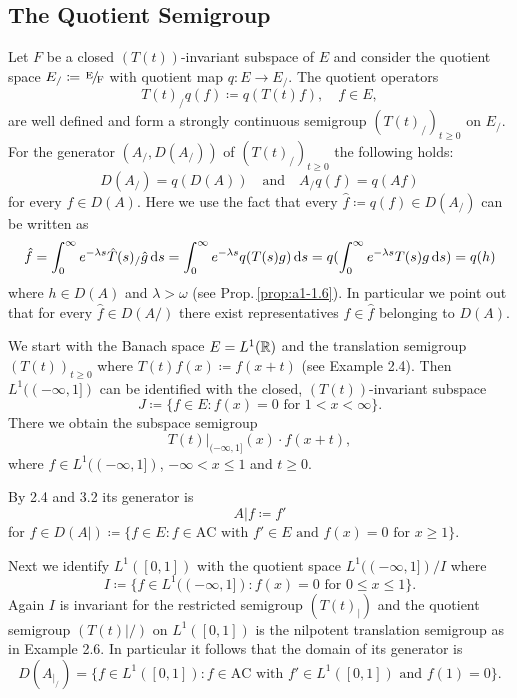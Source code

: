 \subsection{The Quotient Semigroup}\label{subsec:a1-3.3}
Let $F$ be a closed $(T(t))$-invariant subspace of $E$ and consider the quotient space $ E_{/}\coloneqq \nfrac{E}{F} $ with quotient map $q \colon E \to E_{/}$. 
The quotient operators
\[
    T(t)_{/}q(f) \coloneqq q(T(t)f), \quad f \in E,
\]
are well defined and form a strongly continuous semigroup $(T(t)_{/})_{t \geq 0}$ on $E_{/}$.
For the generator $(A_{/},D(A_{/}))$ of $(T(t)_{/})_{t \geq 0}$ the following holds:
\[
    D(A_{/}) = q(D(A)) 
    \quad \text{and} \quad 
    A_{/}q(f) = q(Af)
\]
for every $f \in D(A)$.
Here we use the fact that every $\hat{f} \coloneqq q(f) \in D(A_{/})$ can be written as
\[
    \hat{f} = \int_{0}^{\infty} e^{-\lambda s} \hat{T}(s)_{/}\hat{g} \mathop{}\!\mathrm{d}{s} 
    = \int_{0}^{\infty} e^{-\lambda s}q(T(s)g) \mathop{}\!\mathrm{d}{s} 
    = q(\int_{0}^{\infty} e^{-\lambda s}T(s)g \mathop{}\!\mathrm{d}{s}) = q(h)
\]
where $h \in D(A)$ and $\lambda > \omega$ (see Prop.\,\ref{prop:a1-1.6}).
In particular we point out that for every $\hat{f} \in D(A/)$ there exist representatives $f \in \hat{f}$ belonging to $D(A)$.
\begin{example}\label{ex:a1-3.1}
We start with the Banach space $E = L^{1}(\mathbb{R})$ and the translation semigroup $(T(t))_{t \geq 0}$ where $T(t)f(x) \coloneqq f(x+t)$ (see Example 2.4).
Then $L^{1}((-\infty,1])$ can be identified with the closed, $(T(t))$-invariant subspace
\[
    J \coloneqq \{f \in E \colon f(x) = 0 \text{ for } 1 < x < \infty\} .
\]
There we obtain the subspace semigroup
\[
    T(t)|_{(-\infty,1]}(x) \cdot f(x+t),
\]
where $f \in L^{1}((-\infty,1])$, $-\infty < x \leq 1$ and $t \geq 0$.

By 2.4 and 3.2 its generator is
\[
    A|f \coloneqq f'
\]
for $f \in D(A|) \coloneqq \{f \in E \colon f \in \text{AC} \text{ with } f' \in E \text{ and } f(x) = 0 \text{ for } x \geq 1\}$.

Next we identify $L^{1}(\left[ 0,1 \right])$ with the quotient space $L^{1}((-\infty,1])/I$ where
\[
    I \coloneqq \{f \in L^{1}((-\infty,1]) \colon f(x) = 0 \text{ for } 0 \leq x \leq 1\} .
\]
Again $I$ is invariant for the restricted semigroup $(T(t)_{|})$ and the
quotient semigroup $(T(t)|/)$ on $L^{1}(\left[ 0,1 \right])$ is the nilpotent translation semigroup as in Example 2.6.
In particular it follows that the domain of its generator is
\[
    D(A_{|_{/}}) = \{f \in L^{1}(\left[ 0,1 \right]) \colon f \in \text{AC} \text{ with } f' \in L^{1}(\left[ 0,1 \right]) \text{ and } f(1) = 0\}.
\]
\end{example}
